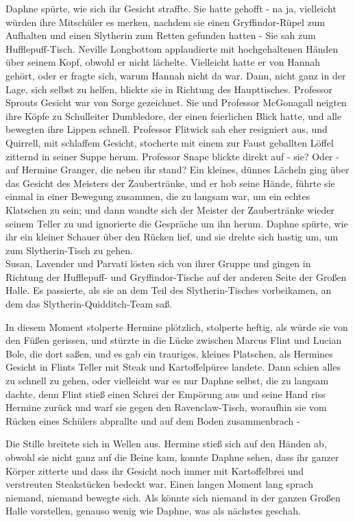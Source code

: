 {Daphne spürte, wie sich ihr Gesicht straffte. Sie hatte gehofft - na ja, vielleicht würden ihre Mitschüler es merken, nachdem sie einen Gryffindor-Rüpel zum Aufhalten und einen Slytherin zum Retten gefunden hatten - Sie sah zum Hufflepuff-Tisch. Neville Longbottom applaudierte mit hochgehaltenen Händen über seinem Kopf, obwohl er nicht lächelte. Vielleicht hatte er von Hannah gehört, oder er fragte sich, warum Hannah nicht da war. Dann, nicht ganz in der Lage, sich selbst zu helfen, blickte sie in Richtung des Haupttisches. Professor Sprouts Gesicht war von Sorge gezeichnet. Sie und Professor McGonagall neigten ihre Köpfe zu Schulleiter Dumbledore, der einen feierlichen Blick hatte, und alle bewegten ihre Lippen schnell. Professor Flitwick sah eher resigniert aus, und Quirrell, mit schlaffem Gesicht, stocherte mit einem zur Faust geballten Löffel zitternd in seiner Suppe herum. Professor Snape blickte direkt auf - sie? Oder - auf Hermine Granger, die neben ihr stand? Ein kleines, dünnes Lächeln ging über das Gesicht des Meisters der Zaubertränke, und er hob seine Hände, führte sie einmal in einer Bewegung zusammen, die zu langsam war, um ein echtes Klatschen zu sein; und dann wandte sich der Meister der Zaubertränke wieder seinem Teller zu und ignorierte die Gespräche um ihn herum. Daphne spürte, wie ihr ein kleiner Schauer über den Rücken lief, und sie drehte sich hastig um, um zum Slytherin-Tisch zu gehen.\\ Susan, Lavender und Parvati lösten sich von ihrer Gruppe und gingen in Richtung der Hufflepuff- und Gryffindor-Tische auf der anderen Seite der Großen Halle. Es passierte, als sie an dem Teil des Slytherin-Tisches vorbeikamen, an dem das Slytherin-Quidditch-Team saß.

In diesem Moment stolperte Hermine plötzlich, stolperte heftig, als würde sie von den Füßen gerissen, und stürzte in die Lücke zwischen Marcus Flint und Lucian Bole, die dort saßen, und es gab ein trauriges, kleines Platschen, als Hermines Gesicht in Flints Teller mit Steak und Kartoffelpüree landete. Dann schien alles zu schnell zu gehen, oder vielleicht war es nur Daphne selbst, die zu langsam dachte, denn Flint stieß einen Schrei der Empörung aus und seine Hand riss Hermine zurück und warf sie gegen den Ravenclaw-Tisch, woraufhin sie vom Rücken eines Schülers abprallte und auf dem Boden zusammenbrach -

Die Stille breitete sich in Wellen aus. Hermine stieß sich auf den Händen ab, obwohl sie nicht ganz auf die Beine kam, konnte Daphne sehen, dass ihr ganzer Körper zitterte und dass ihr Gesicht noch immer mit Kartoffelbrei und verstreuten Steakstücken bedeckt war. Einen langen Moment lang sprach niemand, niemand bewegte sich. Als könnte sich niemand in der ganzen Großen Halle vorstellen, genauso wenig wie Daphne, was als nächstes geschah.

}
